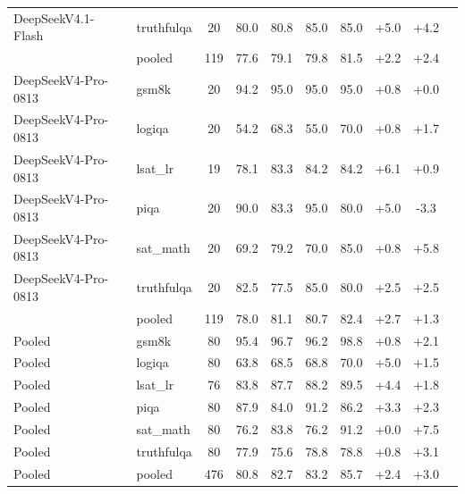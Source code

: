{\begin{tabular}{l l c c c c c c c c}
DeepSeekV4.1-Flash & truthfulqa & 20 & 80.0 & 80.8 & 85.0 & 85.0 & +5.0 & +4.2 \\
 & pooled & 119 & 77.6 & 79.1 & 79.8 & 81.5 & +2.2 & +2.4 \\
\midrule
DeepSeekV4-Pro-0813 & gsm8k & 20 & 94.2 & 95.0 & 95.0 & 95.0 & +0.8 & +0.0 \\
DeepSeekV4-Pro-0813 & logiqa & 20 & 54.2 & 68.3 & 55.0 & 70.0 & +0.8 & +1.7 \\
DeepSeekV4-Pro-0813 & lsat\_lr & 19 & 78.1 & 83.3 & 84.2 & 84.2 & +6.1 & +0.9 \\
DeepSeekV4-Pro-0813 & piqa & 20 & 90.0 & 83.3 & 95.0 & 80.0 & +5.0 & -3.3 \\
DeepSeekV4-Pro-0813 & sat\_math & 20 & 69.2 & 79.2 & 70.0 & 85.0 & +0.8 & +5.8 \\
DeepSeekV4-Pro-0813 & truthfulqa & 20 & 82.5 & 77.5 & 85.0 & 80.0 & +2.5 & +2.5 \\
 & pooled & 119 & 78.0 & 81.1 & 80.7 & 82.4 & +2.7 & +1.3 \\
\midrule
Pooled & gsm8k & 80 & 95.4 & 96.7 & 96.2 & 98.8 & +0.8 & +2.1 \\
Pooled & logiqa & 80 & 63.8 & 68.5 & 68.8 & 70.0 & +5.0 & +1.5 \\
Pooled & lsat\_lr & 76 & 83.8 & 87.7 & 88.2 & 89.5 & +4.4 & +1.8 \\
Pooled & piqa & 80 & 87.9 & 84.0 & 91.2 & 86.2 & +3.3 & +2.3 \\
Pooled & sat\_math & 80 & 76.2 & 83.8 & 76.2 & 91.2 & +0.0 & +7.5 \\
Pooled & truthfulqa & 80 & 77.9 & 75.6 & 78.8 & 78.8 & +0.8 & +3.1 \\
Pooled & pooled & 476 & 80.8 & 82.7 & 83.2 & 85.7 & +2.4 & +3.0 \\
\bottomrule
\end{tabular}}
